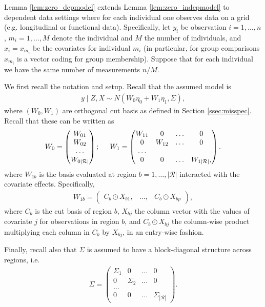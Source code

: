 Lemma \ref{lem:zero_depmodel} extends Lemma \ref{lem:zero_indepmodel} to dependent data settings where 
for each individual one observes data on a grid (e.g. longitudinal or functional data).
Specifically, let $y_i$ be observation $i=1,\ldots,n$, $m_i=1,\ldots,M$ denote the individual and $M$ the number of individuals, 
and $x_i=x_{m_i}$ be the covariates for individual $m_i$ (in particular, for group comparisons $x_{m_i}$ is a vector coding for group membership).
Suppose that for each individual we have the same number of measurements $n/M$.

We first recall the notation and setup. Recall that the assumed model is
\begin{align}
 y \mid Z, X \sim N \left( W_0 \eta_0 + W_1 \eta_1, \Sigma \right),
\nonumber
\end{align}
where $(W_0,W_1)$ are orthogonal cut basis as defined in Section \ref{ssec:misspec}. Recall that these can be written as
\begin{align} 
W_0= \begin{pmatrix} W_{01} \\ W_{02} \\ \ldots \\ W_{0|\mathcal{R}|} \end{pmatrix}
; \hspace{5mm}
W_1= \begin{pmatrix} 
W_{11} & 0 & \ldots &  0 \\
0 & W_{12} & \ldots & 0 \\
\ldots & & & \\
0 & 0 & \ldots & W_{1|\mathcal{R}|},
\end{pmatrix}.
\label{seq:blockdiag_basis}
\end{align}
where $W_{1b}$ is the basis evaluated at region $b=1,\ldots,|\mathcal{R}|$ interacted with the covariate effects.
Specifically,
\begin{align}
  W_{1b}= \begin{pmatrix} C_b \odot X_{b 1}, & \ldots, & C_b \odot X_{b p} \end{pmatrix},
\nonumber
\end{align}
where $C_b$ is the cut basis of region $b$, $X_{b j}$ the column vector with the values of covariate $j$ for observations in region $b$, 
and $C_b \odot X_{b j}$ the column-wise product multiplying each column in $C_b$ by $X_{b j}$, in an entry-wise fashion.


Finally, recall also that $\Sigma$ is assumed to have a block-diagonal structure across regions, i.e.
\begin{align}
 \Sigma= \begin{pmatrix} \Sigma_1 & 0 & \ldots & 0 \\
0 & \Sigma_2 & \ldots & 0 \\
\ldots & & & \\
0 & 0 & \ldots & \Sigma_{|\mathcal{R}|} \end{pmatrix}.
\nonumber
\end{align}

